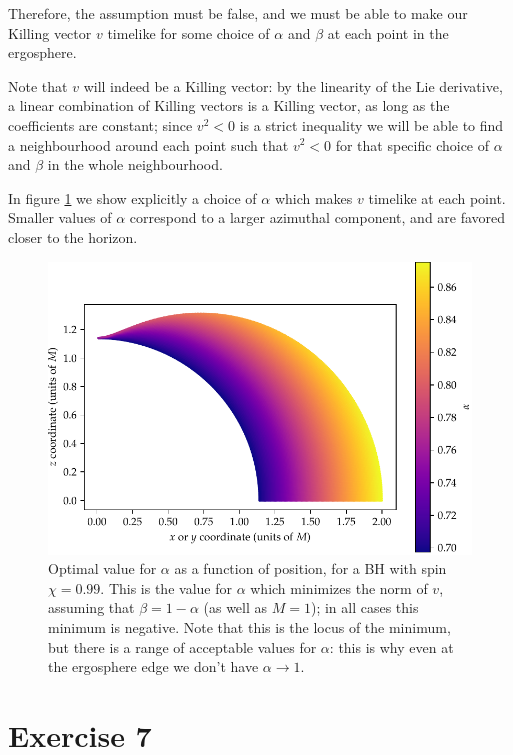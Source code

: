 \documentclass[main.tex]{subfiles}
\begin{document}
Therefore, the assumption must be false, and we must be able to make our Killing vector \(v\) timelike for some choice of \(\alpha \) and \(\beta \) at each point in the ergosphere.

Note that \(v\) will indeed be a Killing vector: by the linearity of the Lie derivative, a linear combination of Killing vectors is a Killing vector, as long as the coefficients are constant; since \(v^2 < 0\) is a strict inequality we will be able to find a neighbourhood around each point such that \(v^2 < 0\) for that specific choice of \(\alpha \) and \(\beta\) in the whole neighbourhood. 

In figure \ref{fig:kerr_killing} we show explicitly a choice of \(\alpha \) which makes \(v\) timelike at each point. Smaller values of \(\alpha \) correspond to a larger azimuthal component, and are favored closer to the horizon. 

\begin{figure}[ht]
\centering
\includegraphics[width=.9\textwidth]{figures/kerr_killing}
\caption{Optimal value for \(\alpha \) as a function of position, for a BH with spin \(\chi = 0.99\). This is the value for \(\alpha \) which minimizes the norm of \(v\), assuming that \(\beta = 1 - \alpha \) (as well as \(M = 1\)); in all cases this minimum is negative.
Note that this is the locus of the minimum, but there is a range of acceptable values for \(\alpha \): this is why even at the ergosphere edge we don't have \(\alpha \to 1\). }
\label{fig:kerr_killing}
\end{figure}

\section*{Exercise 7}
\end{document}
